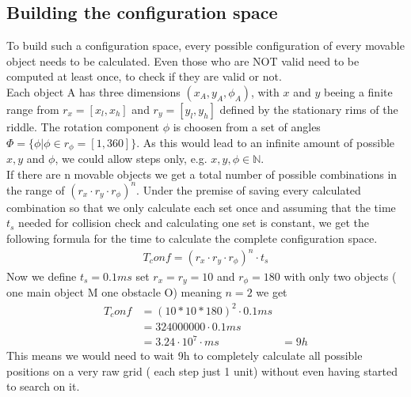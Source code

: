 \subsection{Building the configuration space}
\label{subsec:confspace}
To build such a configuration space, every possible configuration of every movable object needs to be calculated. Even those who are NOT valid need to be computed at least once, to check if they are valid or not.\\
Each object A has three dimensions $(x_A,y_A,\phi_A)$, with $x$ and $y$ beeing a finite range from $r_x=[x_l, x_h]$ and $r_y=[y_l, y_h]$ defined by the stationary rims of the riddle. The rotation component $\phi$ is choosen from a set of angles $\Phi = \{ \phi | \phi \in r_\phi=[1, 360] \}$. As this would lead to an infinite amount of possible $x,y$ and $\phi$, we could allow steps only, e.g. $x,y,\phi \in \mathbb{N}$.\\
If there are n movable objects we get a total number of possible combinations in the range of $(r_x\cdot r_y \cdot r_\phi )^n$.
Under the premise of saving every calculated combination so that we only calculate each set once and assuming that the time $t_s$ needed for collision check and calculating one set is constant, we get the following formula for the time to calculate the complete configuration space.
\begin{align*}
 T_conf = (r_x\cdot r_y \cdot r_\phi )^n \cdot t_s
\end{align*}
Now we define $t_s = 0.1 ms$ set $r_x = r_y = 10$ and $r_\phi = 180$ with only two objects ( one main object M one obstacle O) meaning $n=2$ we get
\begin{align*}
T_conf &= (10*10*180)^2 \cdot 0.1ms\\
	&=   324000000 \cdot 0.1 ms\\
	&= 3.24 \cdot 10^7 \cdot ms
	&= 9 h
\end{align*} 
This means we would need to wait 9h to completely calculate all possible positions on a very raw grid ( each step just 1 unit) without even having started to search on it.

